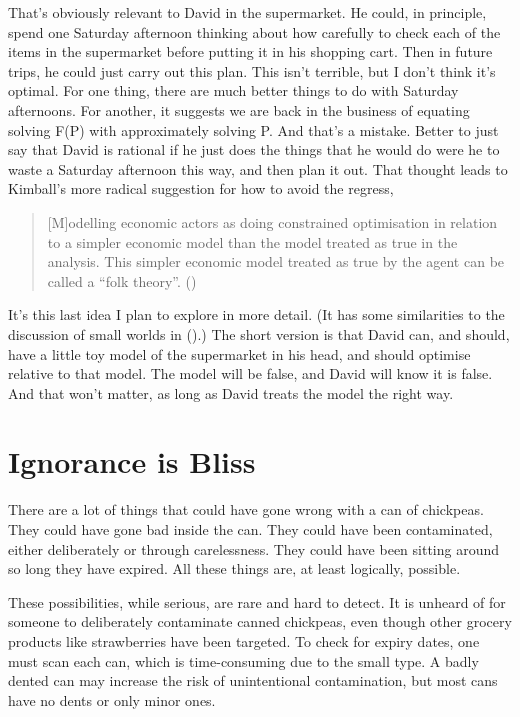 \documentclass[
  10pt,
  letterpaper,
  twoside]{scrbook}
\begin{document}
That's obviously relevant to David in the supermarket. He could, in
principle, spend one Saturday afternoon thinking about how carefully to
check each of the items in the supermarket before putting it in his
shopping cart. Then in future trips, he could just carry out this plan.
This isn't terrible, but I don't think it's optimal. For one thing,
there are much better things to do with Saturday afternoons. For
another, it suggests we are back in the business of equating solving
F(P) with approximately solving P. And that's a mistake. Better to just
say that David is rational if he just does the things that he would do
were he to waste a Saturday afternoon this way, and then plan it out.
That thought leads to Kimball's more radical suggestion for how to avoid
the regress,

\begin{quote}
{[}M{]}odelling economic actors as doing constrained optimisation in
relation to a simpler economic model than the model treated as true in
the analysis. This simpler economic model treated as true by the agent
can be called a ``folk theory''. ()
\end{quote}

It's this last idea I plan to explore in more detail. (It has some
similarities to the discussion of small worlds in
().) The short
version is that David can, and should, have a little toy model of the
supermarket in his head, and should optimise relative to that model. The
model will be false, and David will know it is false. And that won't
matter, as long as David treats the model the right way.

\section{Ignorance is Bliss}\label{sec-ignorancebliss}

There are a lot of things that could have gone wrong with a can of
chickpeas. They could have gone bad inside the can. They could have been
contaminated, either deliberately or through carelessness. They could
have been sitting around so long they have expired. All these things
are, at least logically, possible.

These possibilities, while serious, are rare and hard to detect. It is
unheard of for someone to deliberately contaminate canned chickpeas,
even though other grocery products like strawberries have been targeted.
To check for expiry dates, one must scan each can, which is
time-consuming due to the small type. A badly dented can may increase
the risk of unintentional contamination, but most cans have no dents or
only minor ones.
\end{document}

